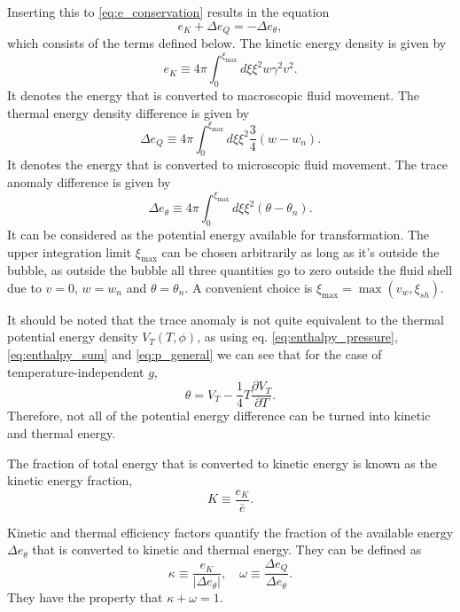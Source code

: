 Inserting this to \eqref{eq:e_conservation} results in the equation \cite[eq. B.24]{hindmarsh_gw_pt_2019}
\begin{equation}
e_K + \Delta e_Q = - \Delta e_\theta,
\end{equation}
which consists of the terms defined below.
The kinetic energy density is given by
\begin{equation}
e_K \equiv 4 \pi \int_0^{\xi_\text{max}} d\xi \xi^2 w \gamma^2 v^2.
\end{equation}
It denotes the energy that is converted to macroscopic fluid movement.
The thermal energy density difference is given by
\begin{equation}
\Delta e_Q \equiv 4 \pi \int_0^{\xi_\text{max}} d\xi \xi^2 \frac{3}{4} (w - w_n).
\end{equation}
It denotes the energy that is converted to microscopic fluid movement.
The trace anomaly difference is given by
\begin{equation}
\Delta e_\theta \equiv 4 \pi \int_0^{\xi_\text{max}} d\xi \xi^2 (\theta - \theta_n).
\end{equation}
It can be considered as the potential energy available for transformation.
The upper integration limit $\xi_\text{max}$ can be chosen arbitrarily as long as it's outside the bubble, as outside the bubble all three quantities go to zero outside the fluid shell due to $v=0$, $w=w_n$ and $\theta = \theta_n$.
A convenient choice is $\xi_\text{max} = \max (v_w, \xi_{sh})$.
\cite[eq. B.25]{hindmarsh_gw_pt_2019}

It should be noted that the trace anomaly is not quite equivalent to the thermal potential energy density $V_T(T,\phi)$, as using eq. \eqref{eq:enthalpy_pressure}, \eqref{eq:enthalpy_sum} and \eqref{eq:p_general} we can see that for the case of temperature-independent $g$,
\begin{equation}
\theta = V_T - \frac{1}{4} T \frac{\partial V_T}{\partial T}.
\end{equation}
Therefore, not all of the potential energy difference can be turned into kinetic and thermal energy.
\cite[ch. B.2]{hindmarsh_gw_pt_2019}

The fraction of total energy that is converted to kinetic energy is known as the kinetic energy fraction,
\begin{equation}
K \equiv \frac{e_K}{\bar{e}}.
\end{equation}

Kinetic and thermal efficiency factors quantify the fraction of the available energy $\Delta e_\theta$ that is converted to kinetic and thermal energy.
They can be defined as
\begin{equation}
\kappa \equiv \frac{e_K}{| \Delta e_\theta |}, \quad
\omega \equiv \frac{\Delta e_Q}{\Delta e_\theta}.
\label{eq:kappa_omega}
\end{equation}
They have the property that $\kappa + \omega = 1$.

